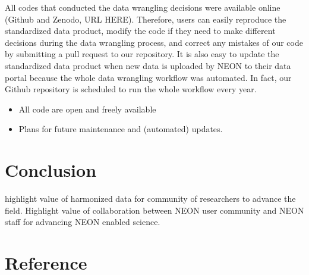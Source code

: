 \documentclass[
  12pt,
]{article}
\providecommand{\tightlist}{%
  \setlength{\itemsep}{0pt}\setlength{\parskip}{0pt}}
\begin{document}
All codes that conducted the data wrangling decisions were available online (Github and Zenodo, URL HERE). Therefore, users can easily reproduce the standardized data product, modify the code if they need to make different decisions during the data wrangling process, and correct any mistakes of our code by submitting a pull request to our repository. It is also easy to update the standardized data product when new data is uploaded by NEON to their data portal because the whole data wrangling workflow was automated. In fact, our Github repository is scheduled to run the whole workflow every year.

\begin{itemize}
\tightlist
\item
  All code are open and freely available
\item
  Plans for future maintenance and (automated) updates.
\end{itemize}

\hypertarget{conclusion}{%
\section{Conclusion}\label{conclusion}}

highlight value of harmonized data for community of researchers to advance the field. Highlight value of collaboration between NEON user community and NEON staff for advancing NEON enabled science.

\hypertarget{reference}{%
\section*{Reference}\label{reference}}
\end{document}
